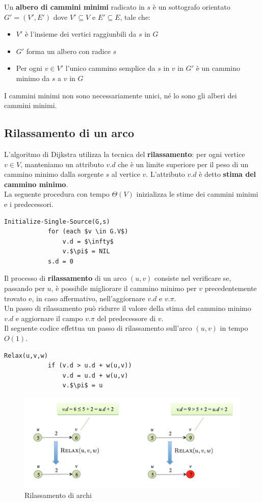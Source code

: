 Un \textbf{albero di cammini minimi} radicato in $s$ è un sottografo orientato $G'=(V', E')$ dove $V' \subseteq V$ e $E' \subseteq E$, tale che:
    \begin{itemize}
        \item{$V'$ è l'insieme dei vertici raggiunbili da $s$ in $G$}
        \item{$G'$ forma un albero con radice $s$}
        \item{Per ogni $v \in V'$ l'unico cammino semplice da $s$ in $v$ in $G'$ è un cammino minimo da $s$ a $v$ in $G$}
    \end{itemize}
I cammini minimi non sono necessariamente unici, né lo sono gli alberi dei cammini minimi.

\subsection{Rilassamento di un arco}
L'algoritmo di Dijkstra utilizza la tecnica del \textbf{rilassamento}: per ogni vertice $v \in V$, manteniamo un attributo $v.d$ che è un limite superiore per il peso di un cammino minimo dalla sorgente $s$ al vertice $v$. L'attributo $v.d$ è detto \textbf{stima del cammino minimo}.\\
La seguente procedura con tempo $\Theta(V)$ inizializza le stime dei cammini minimi e i predecessori.
    \begin{lstlisting}[caption = Inizializzazione delle stime dei cammini minimi]
        Initialize-Single-Source(G,s)
            for (each $v \in G.V$)
                v.d = $\infty$
                v.$\pi$ = NIL
            s.d = 0
    \end{lstlisting}         
Il processo di \textbf{rilassamento} di un arco $(u,v)$ consiste nel verificare se, passando per $u$, è possibile migliorare il cammino minimo per $v$ precedentemente trovato e, in caso affermativo, nell'aggiornare $v.d$ e $v.\pi$.\\
Un passo di rilassamento può ridurre il valore della stima del cammino minimo $v.d$ e aggiornare il campo $v.\pi$ del predecessore di $v$.\\
Il seguente codice effettua un passo di rilassamento sull'arco $(u,v)$ in tempo $O(1)$.
    \begin{lstlisting}[caption = Rilassamento di un arco]    
        Relax(u,v,w)
            if (v.d > u.d + w(u,v))
                v.d = u.d + w(u,v)
                v.$\pi$ = u
    \end{lstlisting}
    \begin{figure}[h!]
        \centering
        \includegraphics[scale = 0.6]{img01.png}
        \caption{Rilassamento di archi}
    \end{figure}
    
